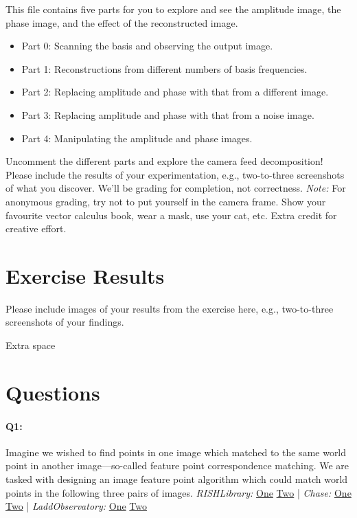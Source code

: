 This file contains five parts for you to explore and see the amplitude image, the phase image, and the effect of the reconstructed image.
\begin{itemize}
    \item Part 0: Scanning the basis and observing the output image.
    \item Part 1: Reconstructions from different numbers of basis frequencies.
    \item Part 2: Replacing amplitude and phase with that from a different image.
    \item Part 3: Replacing amplitude and phase with that from a noise image.
    \item Part 4: Manipulating the amplitude and phase images.
\end{itemize}

Uncomment the different parts and explore the camera feed decomposition! Please include the results of your experimentation, e.g., two-to-three screenshots of what you discover. We'll be grading for completion, not correctness. \emph{Note:} For anonymous grading, try not to put yourself in the camera frame. Show your favourite vector calculus book, wear a mask, use your cat, etc. Extra credit for creative effort.


\pagebreak
\section*{Exercise Results}
Please include images of your results from the exercise here, e.g., two-to-three screenshots of your findings.




\pagebreak
Extra space





\pagebreak
\section*{Questions}

\paragraph{Q1:} Imagine we wished to find points in one image which matched to the same world point in another image---so-called feature point correspondence matching. We are tasked with designing an image feature point algorithm which could match world points in the following three pairs of images.
\newline
\newline
\emph{RISHLibrary:} \href{RISHLibrary1.jpg}{One} \href{RISHLibrary2.jpg}{Two} | \emph{Chase:} \href{Chase1.jpg}{One} \href{Chase2.jpg}{Two} | \emph{LaddObservatory:} \href{LaddObservatory1.jpg}{One} \href{LaddObservatory2.jpg}{Two}

